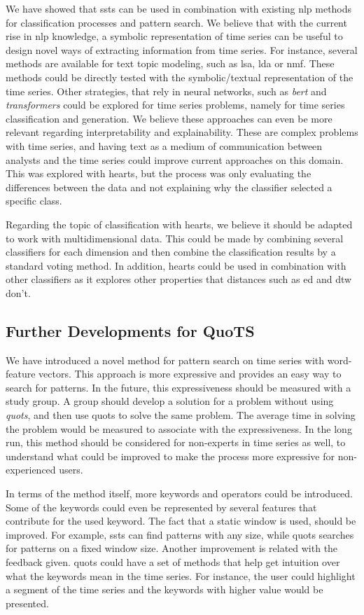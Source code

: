 We have showed that \gls{ssts} can be used in combination with existing \gls{nlp} methods for classification processes and pattern search. We believe that with the current rise in \gls{nlp} knowledge, a symbolic representation of time series can be useful to design novel ways of extracting information from time series. For instance, several methods are available for text topic modeling, such as \gls{lsa}, \gls{lda} or \gls{nmf}. These methods could be directly tested with the symbolic/textual representation of the time series. Other strategies, that rely in neural networks, such as \textit{bert} and \textit{transformers} could be explored for time series problems, namely for time series classification and generation. We believe these approaches can even be more relevant regarding interpretability and explainability. These are complex problems with time series, and having text as a medium of communication between analysts and the time series could improve current approaches on this domain. This was explored with \gls{hearts}, but the process was only evaluating the differences between the data and not explaining why the classifier selected a specific class.
\par
Regarding the topic of classification with \gls{hearts}, we believe it should be adapted to work with multidimensional data. This could be made by combining several classifiers for each dimension and then combine the classification results by a standard voting method. In addition, \gls{hearts} could be used in combination with other classifiers as it explores other properties that distances such as \gls{ed} and \gls{dtw} don't.

\subsection{Further Developments for QuoTS}

We have introduced a novel method for pattern search on time series with word-feature vectors. This approach is more expressive and provides an easy way to search for patterns. In the future, this expressiveness should be measured with a study group. A group should develop a solution for a problem without using \textit{quots}, and then use \gls{quots} to solve the same problem. The average time in solving the problem would be measured to associate with the expressiveness.  In the long run, this method should be considered for non-experts in time series as well, to understand what could be improved to make the process more expressive for non-experienced users.
\par
In terms of the method itself, more keywords and operators could be introduced. Some of the keywords could even be represented by several features that contribute for the used keyword. The fact that a static window is used, should be improved. For example, \gls{ssts} can find patterns with any size, while \gls{quots} searches for patterns on a fixed window size. Another improvement is related with the feedback given. \gls{quots} could have a set of methods that help get intuition over what the keywords mean in the time series. For instance, the user could highlight a segment of the time series and the keywords with higher value would be presented.
